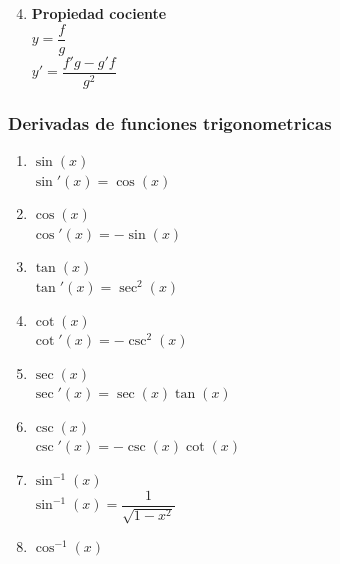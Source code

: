 \documentclass[stu, 12pt, letterpaper, donotrepeattitle, floatsintext, natbib]{apa7}
\begin{document}
    \begin{paracol}{2}
        \begin{enumerate} \setcounter{enumi}{3}
            \item \textbf{Propiedad cociente}\\[0.5cm]
            $y=\dfrac{f}{g}$\\[0.5cm]
            $y'=\dfrac{f'g-g'f}{g^2}$\\[0.5cm]
        \end{enumerate}
    \end{paracol}

    \subsubsection{Derivadas de funciones trigonometricas}
    \begin{paracol}{2}
        \begin{enumerate}
            \item $\sin(x)$\\[0.5cm]
            $\sin'(x)=\cos(x)$\\[0.5cm]
            \item $\cos(x)$\\[0.5cm]
            $\cos'(x)=-\sin(x)$\\[0.5cm]
            \item $\tan(x)$\\[0.5cm]
            $\tan'(x)=\sec^2(x)$\\[0.5cm]
            \item $\cot(x)$\\[0.5cm]
            $\cot'(x)=-\csc^2(x)$\\[0.5cm]
            \item $\sec(x)$\\[0.5cm]
            $\sec'(x)=\sec(x)\tan(x)$\\[0.5cm]
            \item $\csc(x)$\\[0.5cm]
            $\csc'(x)=-\csc(x)\cot(x)$\\[0.5cm]
        \end{enumerate}
        \switchcolumn
        \begin{enumerate} \setcounter{enumi}{6}
            \item $\sin^{-1}(x)$\\[0.5cm]
            $\sin^{-1}(x)=\dfrac{1}{\sqrt{1-x^2}}$\\[0.5cm]
            \item $\cos^{-1}(x)$\\[0.5cm]

\end{enumerate}
\end{paracol}
\end{document}
